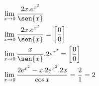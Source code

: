 \begin{ex}
\begin{align}
&\lim_{x\rightarrow 0} \frac{2x.e^{{x}^2}}{\sen{x}}\nonumber\\
&\lim_{x\rightarrow 0} \frac{2x.e^{{x}^2}}{\sen{x}}=\left[\frac{0}{0}\right]\nonumber\\
&\lim_{x\rightarrow 0} \frac{x}{\sen{x}}.2e^{{x}^2}=\left[\frac{0}{0}\right]\nonumber\\
&\lim_{x\rightarrow 0} \frac{2e^{{x}^2}-x.2e^{{x}^2}.2x}{\cos{x}}=\frac{2}{1}=2\nonumber
\end{align}
\end{ex}